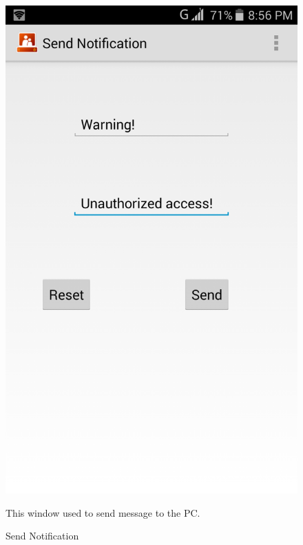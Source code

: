 \begin{figure}
\begin{center}
\scalebox{0.25}
{\includegraphics{message.png}}
\caption{Send Notification}  
\end{center}
This window used to send message to the PC.
\end{figure}

